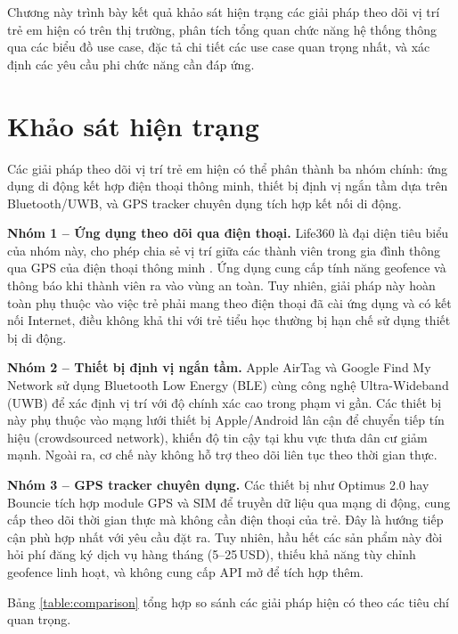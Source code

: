 \documentclass[../DoAn.tex]{subfiles}
\begin{document}
Chương này trình bày kết quả khảo sát hiện trạng các giải pháp theo dõi vị trí trẻ em hiện có trên thị trường, phân tích tổng quan chức năng hệ thống thông qua các biểu đồ use case, đặc tả chi tiết các use case quan trọng nhất, và xác định các yêu cầu phi chức năng cần đáp ứng.

\section{Khảo sát hiện trạng}
\label{section:2.1}

Các giải pháp theo dõi vị trí trẻ em hiện có thể phân thành ba nhóm chính: ứng dụng di động kết hợp điện thoại thông minh, thiết bị định vị ngắn tầm dựa trên Bluetooth/UWB, và GPS tracker chuyên dụng tích hợp kết nối di động.

\textbf{Nhóm 1 – Ứng dụng theo dõi qua điện thoại.} Life360 là đại diện tiêu biểu của nhóm này, cho phép chia sẻ vị trí giữa các thành viên trong gia đình thông qua GPS của điện thoại thông minh \cite{life360}. Ứng dụng cung cấp tính năng geofence và thông báo khi thành viên ra vào vùng an toàn. Tuy nhiên, giải pháp này hoàn toàn phụ thuộc vào việc trẻ phải mang theo điện thoại đã cài ứng dụng và có kết nối Internet, điều không khả thi với trẻ tiểu học thường bị hạn chế sử dụng thiết bị di động.

\textbf{Nhóm 2 – Thiết bị định vị ngắn tầm.} Apple AirTag và Google Find My Network sử dụng Bluetooth Low Energy (BLE) cùng công nghệ Ultra-Wideband (UWB) để xác định vị trí với độ chính xác cao trong phạm vi gần. Các thiết bị này phụ thuộc vào mạng lưới thiết bị Apple/Android lân cận để chuyển tiếp tín hiệu (crowdsourced network), khiến độ tin cậy tại khu vực thưa dân cư giảm mạnh. Ngoài ra, cơ chế này không hỗ trợ theo dõi liên tục theo thời gian thực.

\textbf{Nhóm 3 – GPS tracker chuyên dụng.} Các thiết bị như Optimus 2.0 hay Bouncie tích hợp module GPS và SIM để truyền dữ liệu qua mạng di động, cung cấp theo dõi thời gian thực mà không cần điện thoại của trẻ. Đây là hướng tiếp cận phù hợp nhất với yêu cầu đặt ra. Tuy nhiên, hầu hết các sản phẩm này đòi hỏi phí đăng ký dịch vụ hàng tháng (5–25\,USD), thiếu khả năng tùy chỉnh geofence linh hoạt, và không cung cấp API mở để tích hợp thêm.

Bảng \ref{table:comparison} tổng hợp so sánh các giải pháp hiện có theo các tiêu chí quan trọng.
\end{document}
